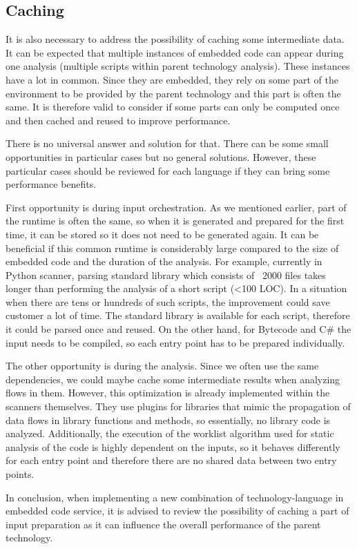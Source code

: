 \subsection{Caching}
It is also necessary to address the possibility of caching some intermediate data. It can be expected that multiple instances of embedded code can appear during one analysis (multiple scripts within parent technology analysis). These instances have a lot in common. Since they are embedded, they rely on some part of the environment to be provided by the parent technology and this part is often the same. It is therefore valid to consider if some parts can only be computed once and then cached and reused to improve performance.
\par
There is no universal answer and solution for that. There can be some small opportunities in particular cases but no general solutions. However, these particular cases should be reviewed for each language if they can bring some performance benefits.
\par
First opportunity is during input orchestration. As we mentioned earlier, part of the runtime is often the same, so when it is generated and prepared for the first time, it can be stored so it does not need to be generated again. It can be beneficial if this common runtime is considerably large compared to the size of embedded code and the duration of the analysis. For example, currently in Python scanner, parsing standard library which consists of ~2000 files takes longer than performing the analysis of a short script (<100 LOC). In a situation when there are tens or hundreds of such scripts, the improvement could save customer a lot of time. The standard library is available for each script, therefore it could be parsed once and reused. On the other hand, for Bytecode and C\# the input needs to be compiled, so each entry point has to be prepared individually.
\par
The other opportunity is during the analysis. Since we often use the same dependencies, we could maybe cache some intermediate results when analyzing flows in them. However, this optimization is already implemented within the scanners themselves. They use plugins for libraries that mimic the propagation of data flows in library functions and methods, so essentially, no library code is analyzed. Additionally, the execution of the worklist algorithm used for static analysis of the code is highly dependent on the inputs, so it behaves differently for each entry point and therefore there are no shared data between two entry points.
\par
In conclusion, when implementing a new combination of technology-language in embedded code service, it is advised to review the possibility of caching a part of input preparation as it can influence the overall performance of the parent technology.


